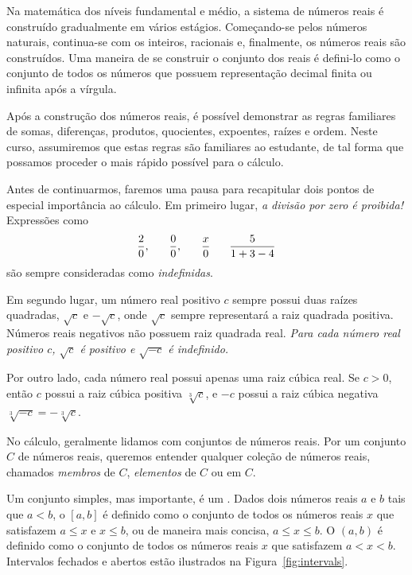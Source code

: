 Na matemática dos níveis fundamental e médio, a sistema de números
reais é construído gradualmente em vários estágios. Começando-se
pelos números naturais, continua-se com os inteiros,
racionais e, finalmente, os números reais são construídos. Uma
maneira de se construir o conjunto dos reais é defini-lo
como o conjunto de todos os números que possuem representação
decimal finita ou infinita após a vírgula.

Após a construção dos números reais, é possível demonstrar as
regras familiares de somas, diferenças, produtos, quocientes,
expoentes, raízes e ordem. Neste curso, assumiremos que estas
regras são familiares ao estudante, de tal forma que possamos
proceder o mais rápido possível para o cálculo.

Antes de continuarmos, faremos uma pausa para recapitular dois
pontos de especial importância ao cálculo. Em primeiro lugar,
\emph{a divisão por zero é proibida!} Expressões como
\[
\frac{2}{0}, \hspace{4ex} \frac{0}{0}, \hspace{4ex} 
\frac{x}{0} \hspace{4ex} \frac{5}{1+3-4}
\]
são sempre consideradas como \emph{indefinidas}.

Em segundo lugar, um número real positivo $c$ sempre possui duas
raízes quadradas, $\sqrt{c}$ e $-\sqrt{c}$, onde $\sqrt{c}$ sempre
representará a raiz quadrada positiva. Números reais negativos não
possuem raiz quadrada real. \emph{Para cada número real positivo
$c$, $\sqrt{c}$ é positivo e $\sqrt{-c}$ é indefinido.}

Por outro lado, cada número real possui apenas uma raiz cúbica real.
Se $c > 0$, então $c$ possui a raiz cúbica positiva $\sqrt[3]{c}$, e $-c$
possui a raiz cúbica negativa $\sqrt[3]{-c} = -\sqrt[3]{c}$.

No cálculo, geralmente lidamos com conjuntos de números reais. Por um
conjunto $C$ de números reais, queremos entender qualquer coleção de
números reais, chamados \emph{membros} de $C$, \emph{elementos} de $C$
ou  em $C$.

Um conjunto simples, mas importante, é um . Dados dois
números reais $a$ e $b$ tais que $a < b$, o
$[a, b]$ é definido como o conjunto de todos os números reais $x$
que satisfazem $a \le x$ e $x \le b$, ou de maneira mais concisa,
$a \le x \le b$.
O  $(a, b)$ é definido como o
conjunto de todos os números reais $x$ que satisfazem $a < x < b$.
Intervalos fechados e abertos estão ilustrados na Figura~\ref{fig:intervals}. 

